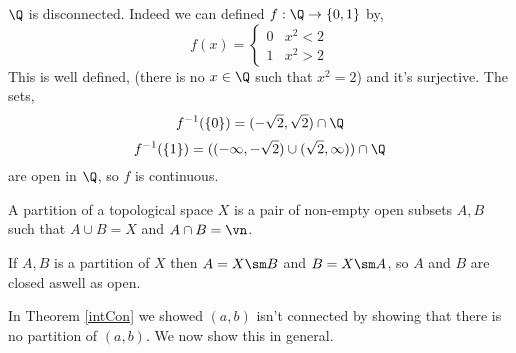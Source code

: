 \begin{eg}
  $\Q$ is disconnected. Indeed we can defined $f : \Q \to \{0, 1\}$ by,
  $$ f(x) = \begin{cases}
    0 & x^2 < 2 \\
    1 & x^2 > 2
  \end{cases} $$
  This is well defined, (there is no $x \in \Q$ such that $x^2 = 2$) and it's surjective. The sets,
  $$ f^{-1}(\{0\}) = (- \sqrt 2, \sqrt 2) \cap \Q $$
  $$ f^{-1}(\{1\}) = ((-\infty, -\sqrt 2) \cup (\sqrt 2, \infty))\cap \Q $$
  are open in $\Q$, so $f$ is continuous.
\end{eg}

\begin{ndefi}[Partition]
  A partition of a topological space $X$ is a pair of non-empty open subsets $A, B$ such that $A \cup B = X$ and $A \cap B = \vn$.
\end{ndefi}

\begin{remark}
   If $A, B$ is a partition of $X$ then $A = X \sm B$ and $B = X\sm A$, so $A$ and $B$ are closed aswell as open.
\end{remark}

\begin{remark}
  In Theorem \ref{intCon} we showed $(a, b)$ isn't connected by showing that there is no partition of $(a, b)$. We now show this in general.
\end{remark}

